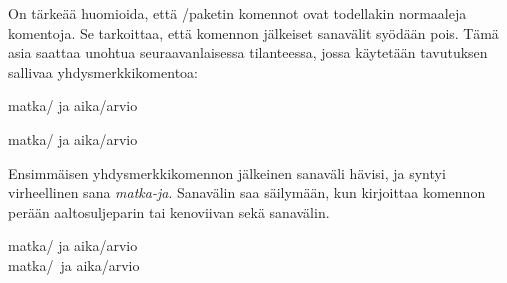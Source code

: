 
On tärkeää huomioida, että \-/paketin komennot ovat
todellakin normaaleja komentoja. Se tarkoittaa, että komennon jälkeiset
sanavälit syödään pois. Tämä asia saattaa unohtua seuraavanlaisessa
tilanteessa, jossa käytetään tavutuksen sallivaa yhdysmerkkikomentoa:

\komentoi{-/}
\begin{koodilohkosis}
matka\-/ ja aika\-/arvio
\end{koodilohkosis}

\begin{tulossis}
  matka\-/ ja aika\-/arvio
\end{tulossis}

\noindent
Ensimmäisen yhdysmerkkikomennon jälkeinen sanaväli hävisi, ja syntyi
virheellinen sana \emph{matka-ja}. Sanavälin saa säilymään, kun
kirjoittaa komennon perään aaltosuljeparin tai kenoviivan sekä
sanavälin.

\komentoi{-/}
\begin{koodilohkosis}
matka\-/{} ja aika\-/arvio \\
matka\-/\ ja aika\-/arvio
\end{koodilohkosis}

